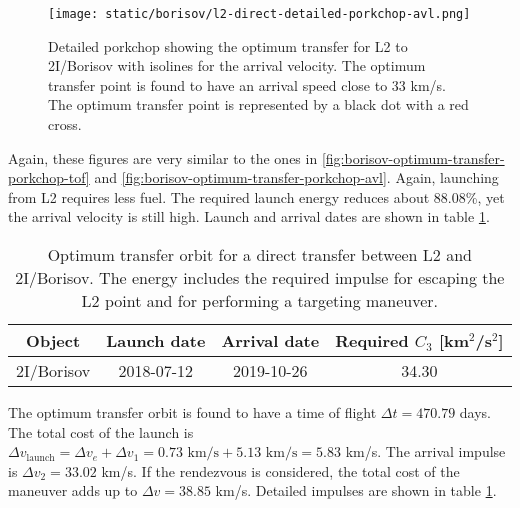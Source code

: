 \begin{figure}[H]
  \centering
  \texttt{[image: static/borisov/l2-direct-detailed-porkchop-avl.png]}
  \caption[Detailed porkchop showing the optimum transfer for
    L2 to 2I/Borisov with the arrival velocity.]{Detailed porkchop showing the
    optimum transfer for L2 to 2I/Borisov with isolines for the arrival
    velocity. The optimum transfer point is found to have an arrival speed
    close to 33 km/s. The optimum transfer point is represented by a black dot
        with a red cross.
}
  \label{fig:l2-borisov-optimum-porkchop-avl}
\end{figure}

Again, these figures are very similar to the ones in
\ref{fig:borisov-optimum-transfer-porkchop-tof} and
\ref{fig:borisov-optimum-transfer-porkchop-avl}. Again, launching from L2
requires less fuel. The required launch energy reduces about 88.08\%, yet the
arrival velocity is still high. Launch and arrival dates are shown in table
\ref{tab:l2-borisov-direct-transfer-optimum}.

\vspace{1cm}
\begin{table}[H]
  \centering
  \begin{tabular}{|c|c|c|c|}
    \hline
    Object     & Launch date & Arrival date & Required $C_3$ [km$^2$/s$^2$] \\
    \hline
    2I/Borisov & 2018-07-12  & 2019-10-26   & 34.30                         \\
    \hline
  \end{tabular}
  \caption[Optimum transfer orbit for a direct transfer between L2 and
    2I/Borisov.]{Optimum transfer orbit for a direct transfer between
    L2 and 2I/Borisov. The energy includes the required impulse for
    escaping the L2 point and for performing a targeting maneuver.}
  \label{tab:l2-borisov-direct-transfer-optimum}
\end{table}

The optimum transfer orbit is found to have a time of flight $\Delta t = 470.79$
days. The total cost of the launch is $\Delta v_\text{launch} = \Delta v_e +
  \Delta v_1 = 0.73 \text{ km/s} + 5.13 \text{ km/s} = 5.83$ km/s. The arrival
impulse is $\Delta v_2 = 33.02$ km/s. If the rendezvous is considered, the total
cost of the maneuver adds up to $\Delta v = 38.85$ km/s. Detailed impulses are
shown in table \ref{tab:l2-borisov-direct-transfer-optimum}.

